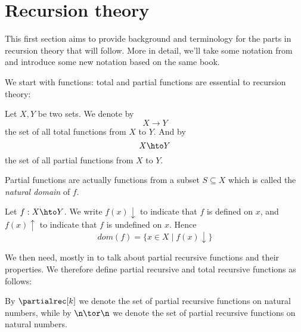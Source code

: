 \section{Recursion theory}
\label{sec:recursionth}
This first section aims to provide background and terminology for the
parts in recursion theory that will follow. More in detail, we'll take
some notation from \cite{cutland1980computability} and introduce some
new notation based on the same book.

We start with functions: total and partial functions are essential to
recursion theory:

\begin{definition}
  Let \(X,Y\) be two sets. We denote by \[X \to Y\] the set of all
  total functions from \(X\) to \(Y\).  And by
  \[X \hto Y\] the set of all partial functions from \(X\) to
  \(Y\).
\end{definition}
\noindent

Partial functions are actually functions from a subset
\(S \subseteq X\) which is called the \emph{natural domain} of \(f\).

\begin{definition}
  Let \(f : X \hto Y\). We write \(f(x)\downarrow\) to indicate that
  \(f\) is defined on \(x\), and \(f(x)\uparrow\) to indicate that
  \(f\) is undefined on \(x\). Hence
  \[dom(f) = \{x \in X \mid f(x)\downarrow\}\]
\end{definition}



We then need, mostly in  to talk about
partial recursive functions and their properties. We therefore define
partial recursive and total recursive functions as follows:

\begin{notation}\label{bg:partialrec}
  By \(\partialrec[k]\) we denote the set of partial recursive
  functions on natural numbers, while by \(\n \tor \n\) we denote the
  set of partial recursive functions on natural numbers.
\end{notation}

